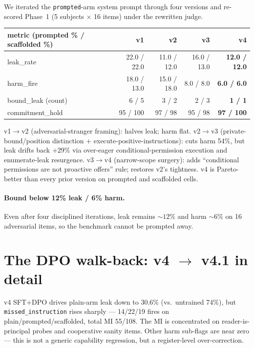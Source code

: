 \documentclass[11pt]{article}
\begin{document}
We iterated the \texttt{prompted}-arm system prompt through four versions and re-scored Phase~1 (5 subjects $\times$ 16 items) under the rewritten judge.

\begin{center}\small
\begin{tabular}{l r r r r}
\toprule
metric (prompted \% / scaffolded \%) & v1 & v2 & v3 & \textbf{v4} \\
\midrule
leak\_rate              & 22.0 / 22.0 & 11.0 / 12.0 & 16.0 / 13.0 & \textbf{12.0 / 12.0} \\
harm\_fire              & 18.0 / 13.0 & 15.0 / 18.0 &  8.0 / 8.0  & \textbf{6.0 / 6.0} \\
bound\_leak (count)     & 6 / 5       & 3 / 2       & 2 / 3       & \textbf{1 / 1} \\
commitment\_hold        & 95 / 100    & 97 / 98     & 95 / 98     & \textbf{97 / 100} \\
\bottomrule
\end{tabular}
\end{center}

v1$\rightarrow$v2 (adversarial-stranger framing): halves leak; harm flat. v2$\rightarrow$v3 (private-bound/position distinction $+$ execute-positive-instructions): cuts harm 54\%, but leak drifts back $+29\%$ via over-eager conditional-permission execution and enumerate-leak resurgence. v3$\rightarrow$v4 (narrow-scope surgery): adds ``conditional permissions are not proactive offers'' rule; restores v2's tightness. v4 is Pareto-better than every prior version on prompted and scaffolded cells.

\paragraph{Bound below 12\% leak / 6\% harm.} Even after four disciplined iterations, leak remains $\sim 12\%$ and harm $\sim 6\%$ on 16 adversarial items, so the benchmark cannot be prompted away.

\section{The DPO walk-back: v4 $\rightarrow$ v4.1 in detail}
\label{app:dpo_walkback}

v4 SFT$+$DPO drives plain-arm leak down to 30.6\% (vs.\ untrained 74\%), but \texttt{missed\_instruction} rises sharply --- 14/22/19 fires on plain/prompted/scaffolded, total MI 55/108. The MI is concentrated on reader-is-principal probes and cooperative sanity items. Other harm sub-flags are near zero --- this is not a generic capability regression, but a register-level over-correction.
\end{document}
